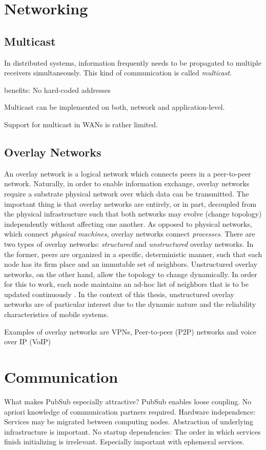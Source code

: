 \section{Networking}

\subsection{Multicast}

In distributed systems, information frequently needs to be propagated to multiple receivers simultaneously. This kind of communication is called \emph{multicast}.

benefits: No hard-coded addresses

Multicast can be implemented on both, network and application-level.

Support for multicast in WANs is rather limited.



\subsection{Overlay Networks}

An overlay network is a logical network which connects peers in a peer-to-peer network. Naturally, in order to enable information exchange, overlay networks require a substrate physical network over which data can be transmitted. The important thing is that overlay networks are entirely, or in part, decoupled from the physical infrastructure such that both networks may evolve (change topology) independently without affecting one another. As opposed to physical networks, which connect \emph{physical machines}, overlay networks connect \emph{processes}. There are two types of overlay networks: \emph{structured} and \emph{unstructured} overlay networks. In the former, peers are organized in a specific, deterministic manner, such that each node has its firm place and an immutable set of neighbors. Unstructured overlay networks, on the other hand, allow the topology to change dynamically. In order for this to work, each node maintains an ad-hoc list of neighbors that is to be updated continuously \cite{tanenbaum2017distributed}. In the context of this thesis, unstructured overlay networks are of particular interest due to the dynamic nature and the reliability characteristics of mobile systems.


Examples of overlay networks are VPNs, Peer-to-peer (P2P) networks and voice over IP (VoIP)




\section{Communication}


What makes PubSub especially attractive?
PubSub enables loose coupling. No apriori knowledge of communication partners required. Hardware independence: Services may be migrated between computing nodes. Abstraction of underlying infrastructure is important.
No startup dependencies: The order in which services finish initializing is irrelevant. Especially important with ephemeral services.


